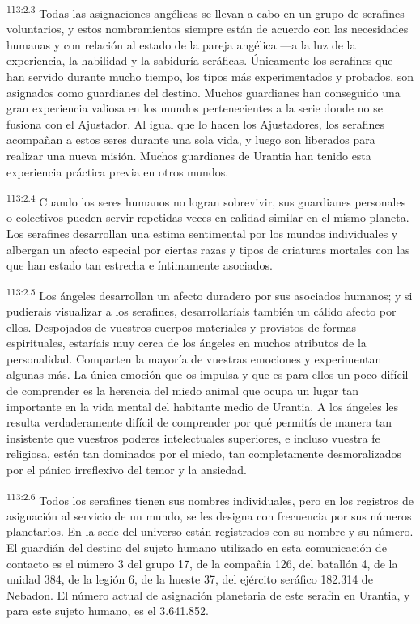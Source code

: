 \par
\textsuperscript{113:2.3} Todas las asignaciones angélicas se llevan a cabo en un grupo de serafines voluntarios, y estos nombramientos siempre están de acuerdo con las necesidades humanas y con relación al estado de la pareja angélica ---a la luz de la experiencia, la habilidad y la sabiduría seráficas. Únicamente los serafines que han servido durante mucho tiempo, los tipos más experimentados y probados, son asignados como guardianes del destino. Muchos guardianes han conseguido una gran experiencia valiosa en los mundos pertenecientes a la serie donde no se fusiona con el Ajustador. Al igual que lo hacen los Ajustadores, los serafines acompañan a estos seres durante una sola vida, y luego son liberados para realizar una nueva misión. Muchos guardianes de Urantia han tenido esta experiencia práctica previa en otros mundos.

\par
\textsuperscript{113:2.4} Cuando los seres humanos no logran sobrevivir, sus guardianes personales o colectivos pueden servir repetidas veces en calidad similar en el mismo planeta. Los serafines desarrollan una estima sentimental por los mundos individuales y albergan un afecto especial por ciertas razas y tipos de criaturas mortales con las que han estado tan estrecha e íntimamente asociados.

\par
\textsuperscript{113:2.5} Los ángeles desarrollan un afecto duradero por sus asociados humanos; y si pudierais visualizar a los serafines, desarrollaríais también un cálido afecto por ellos. Despojados de vuestros cuerpos materiales y provistos de formas espirituales, estaríais muy cerca de los ángeles en muchos atributos de la personalidad. Comparten la mayoría de vuestras emociones y experimentan algunas más. La única emoción que os impulsa y que es para ellos un poco difícil de comprender es la herencia del miedo animal que ocupa un lugar tan importante en la vida mental del habitante medio de Urantia. A los ángeles les resulta verdaderamente difícil de comprender por qué permitís de manera tan insistente que vuestros poderes intelectuales superiores, e incluso vuestra fe religiosa, estén tan dominados por el miedo, tan completamente desmoralizados por el pánico irreflexivo del temor y la ansiedad.

\par
\textsuperscript{113:2.6} Todos los serafines tienen sus nombres individuales, pero en los registros de asignación al servicio de un mundo, se les designa con frecuencia por sus números planetarios. En la sede del universo están registrados con su nombre y su número. El guardián del destino del sujeto humano utilizado en esta comunicación de contacto es el número 3 del grupo 17, de la compañía 126, del batallón 4, de la unidad 384, de la legión 6, de la hueste 37, del ejército seráfico 182.314 de Nebadon. El número actual de asignación planetaria de este serafín en Urantia, y para este sujeto humano, es el 3.641.852.


